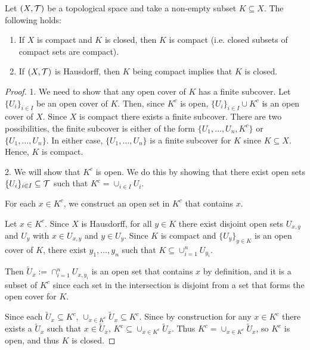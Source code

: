 \documentclass{article}
\begin{document}
\begin{proposition} Let $(X,\mathcal{T})$ be a topological space and take a non-empty subset $K\subseteq X$. The following holds:
\begin{enumerate}
    \item If $X$ is compact and $K$ is closed, then $K$ is compact (i.e. closed subsets of compact sets are compact).
    \item If $(X,\mathcal{T})$ is Hausdorff, then $K$ being compact implies that $K$ is closed.
\end{enumerate}
\end{proposition}
\begin{proof}
1. We need to show that any open cover of $K$ has a finite subcover. Let $\{U_i\}_{i\in I}$ be an open cover of $K$. Then, since $K^c$ is open, $\{U_i\}_{i\in I} \cup {K^c}$ is an open cover of $X$. Since $X$ is compact there exists a finite subcover. There are two possibilities,  the finite subcover is either of the form $\{U_1, \ldots, U_n, K^c\}$ or $\{U_1, \ldots, U_n\}$. In either case, $\{U_1, \ldots, U_n\}$ is a finite subcover for $K$ since $K \subseteq X$. Hence, $K$ is compact. 
    
2. We will show that $K^c$ is open. We do this by showing that there exist open sets $\{U_i\}_{i \in I} \subseteq \mathcal{T}$ such that $K^c = \cup_{i \in I}  U_i$. 

For each $x\in K^c$, we construct an open set in $K^c$ that contains $x$.

Let $x\in K^c$. Since $X$ is Hausdorff, for all $y\in K$ there exist disjoint open sets $U_{x,y}$ and $U_y$ with $x\in U_{x,y}$ and  $y\in U_y$. Since $K$ is compact and $\{U_y\}_{y\in K}$ is an open cover of $K$, there exist $y_1,\ldots, y_n$ such that $K\subseteq \cup_{i=1}^n U_{y_i}$.

Then $\tilde U_x := \cap_{i=1}^n U_{x,y_i}$ is an open set that contains $x$ by definition, and it is a subset of $K^c$ since each set in the intersection is disjoint from a set that forms the open cover for $K$.

Since each $\tilde U_x \subseteq K^c$, $\cup_{x \in K^c} \tilde U_x \subseteq K^c$. Since by construction for any $x \in K^c$ there exists a $\tilde U_x$ such that $x \in \tilde U_x$, $K^c \subseteq \cup_{x \in K^c} \tilde U_x$. Thus $K^c = \cup_{x \in K^c} \tilde U_x$, so $K^c$ is open, and thus $K$ is closed.
\end{proof}
\end{document}

